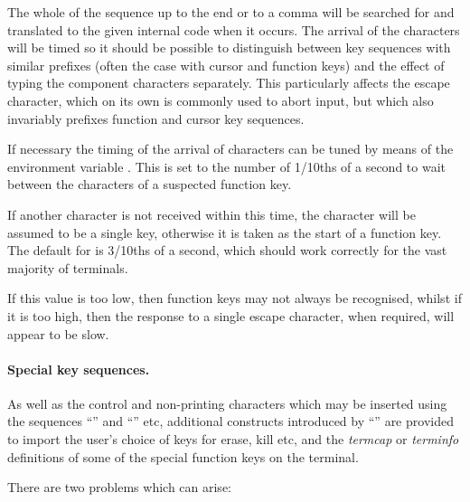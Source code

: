 The whole of the sequence up to the end or to a comma will be searched for and translated to the given internal code when it occurs. The
arrival of the characters will be timed so it should be possible to distinguish between key sequences with similar prefixes (often the case
with cursor and function keys) and the effect of typing the component characters separately. This particularly affects the escape character,
which on its own is commonly used to abort input, but which also invariably prefixes function and cursor key sequences.

If necessary the timing of the arrival of characters can be tuned by means of the environment variable . This is
set to the number of 1/10ths of a second to wait between the characters of a suspected function key.

If another character is not received within this time, the character will be assumed to be a single key, otherwise it is taken as the start
of a function key. The default for  is 3/10ths of a second, which should work correctly for the vast majority
of terminals.

If this value is too low, then function keys may not always be recognised, whilst if it is too high, then the response to a single
escape character, when required, will appear to be slow.

\paragraph{Special key sequences.}
As well as the control and non-printing characters which may be inserted using the sequences
``'' and ``'' etc, additional constructs introduced by
``'' are provided to import the user's choice of keys for erase, kill etc,
and the \textit{termcap} or \textit{terminfo} definitions of some of the special function keys on the terminal.

There are two problems which can arise:

